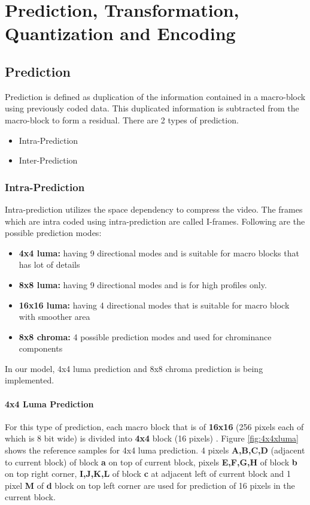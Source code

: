 
\chapter{Prediction, Transformation, Quantization and Encoding} %
\label{Chapter3}

\section{Prediction}
Prediction is defined as duplication of the information contained in a macro-block using previously coded data. This duplicated information is subtracted from the macro-block to form a residual. There are 2 types of prediction.

\begin{itemize}
	\item Intra-Prediction
	\item Inter-Prediction
\end{itemize}

\subsection{Intra-Prediction}
Intra-prediction utilizes the space dependency to compress the video. The frames which are intra coded using intra-prediction are called I-frames. Following are the possible prediction modes:
\begin{itemize}
	\item \textbf{4x4 luma:} having 9 directional modes and is suitable for macro blocks that has lot of details
	\item \textbf{8x8 luma:} having 9 directional modes and is for high profiles only.
	\item \textbf{16x16 luma:} having 4 directional modes that is suitable for macro block with smoother area
	\item \textbf{8x8 chroma:} 4 possible prediction modes and used for chrominance components
\end{itemize}
In our model, 4x4 luma prediction and 8x8 chroma prediction is being implemented.

\subsubsection{4x4 Luma Prediction}
For this type of prediction, each macro block that is of \textbf{16x16} (256 pixels each of which is 8 bit wide) is divided into \textbf{4x4} block (16 pixels) \cite{anilkumar2021intra}. Figure \ref{fig:4x4xluma} shows the reference samples for 4x4 luma prediction. 4 pixels \textbf{A,B,C,D} (adjacent to current block) of block \textbf{a}  on top of current block, pixels \textbf{E,F,G,H} of block \textbf{b} on top right corner, \textbf{I,J,K,L} of block \textbf{c} at adjacent left of current block and 1 pixel \textbf{M} of \textbf{d} block on top left corner are used for prediction of 16 pixels in the current block.


